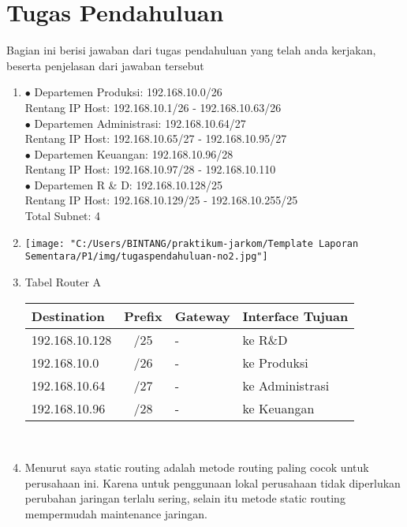 \section{Tugas Pendahuluan}
Bagian ini berisi jawaban dari tugas pendahuluan yang telah anda kerjakan, beserta penjelasan dari jawaban tersebut
\begin{enumerate}
	\item $\bullet$ Departemen Produksi: 192.168.10.0/26\\
	Rentang IP Host: 192.168.10.1/26 - 192.168.10.63/26 \\
	$\bullet$ Departemen Administrasi: 192.168.10.64/27\\
	Rentang IP Host: 192.168.10.65/27 - 192.168.10.95/27\\
	$\bullet$ Departemen Keuangan: 192.168.10.96/28\\
	Rentang IP Host: 192.168.10.97/28 - 192.168.10.110\\
	$\bullet$ Departemen R \& D: 192.168.10.128/25\\
	Rentang IP Host: 192.168.10.129/25 - 192.168.10.255/25\\
	Total Subnet: 4\\
	\item 
		\texttt{[image: "C:/Users/BINTANG/praktikum-jarkom/Template Laporan Sementara/P1/img/tugaspendahuluan-no2.jpg"]}
	\item Tabel Router A\\
	\begin{tabular}{|l|c|l|l|}
		\hline
		\textbf{Destination} & \textbf{Prefix} & \textbf{Gateway} & \textbf{Interface Tujuan} \\
		\hline
		192.168.10.128   & /25 & -   & ke R\&D \\
		192.168.10.0      & /26  & -      & ke Produksi \\
		192.168.10.64    & /27 & -  & ke Administrasi \\
		192.168.10.96       & /28  & -   & ke Keuangan \\
		\hline
	\end{tabular}\\

	\item Menurut saya static routing adalah metode routing paling cocok untuk perusahaan ini. Karena untuk penggunaan lokal perusahaan tidak diperlukan perubahan jaringan terlalu sering, selain itu metode static routing mempermudah maintenance jaringan.
\end{enumerate}